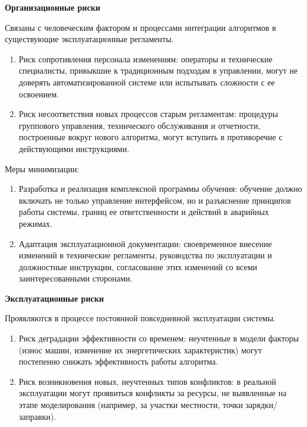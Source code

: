 \textbf{Организационные риски}

Связаны с человеческим фактором и процессами интеграции алгоритмов в существующие эксплуатационные регламенты.

\begin{enumerate}[beginpenalty=10000, midpenalty=10000, wide=\parindent, leftmargin=0pt]
	\item Риск сопротивления персонала изменениям: операторы и технические специалисты, привыкшие к традиционным подходам в управлении, могут не доверять автоматизированной системе или испытывать сложности с ее освоением.
	\item Риск несоответствия новых процессов старым регламентам: процедуры группового управления, технического обслуживания и отчетности, построенные вокруг нового алгоритма, могут вступить в противоречие с действующими инструкциями.
\end{enumerate}

Меры минимизации:
\begin{enumerate}[beginpenalty=10000, midpenalty=10000, wide=\parindent, leftmargin=0pt]
	\item Разработка и реализация комплексной программы обучения: обучение должно включать не только управление интерфейсом, но и разъяснение принципов работы системы, границ ее ответственности и действий в аварийных режимах.
	\item Адаптация эксплуатационной документации: своевременное внесение изменений в технические регламенты, руководства по эксплуатации и должностные инструкции, согласование этих изменений со всеми заинтересованными сторонами.
\end{enumerate}

\textbf{Эксплуатационные риски}

Проявляются в процессе постоянной повседневной эксплуатации системы.

\begin{enumerate}[beginpenalty=10000, midpenalty=10000, wide=\parindent, leftmargin=0pt]
	\item Риск деградации эффективности со временем: неучтенные в модели факторы (износ машин, изменение их энергетических характеристик) могут постепенно снижать эффективность работы алгоритма.
	\item Риск возникновения новых, неучтенных типов конфликтов: в реальной эксплуатации могут проявиться конфликты за ресурсы, не выявленные на этапе моделирования (например, за участки местности, точки зарядки/заправки).
\end{enumerate}

